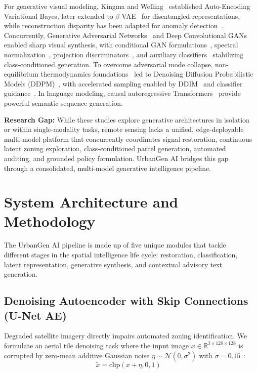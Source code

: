 \documentclass[conference]{IEEEtran}
\begin{document}
For generative visual modeling, Kingma and Welling~\cite{kingma2013auto} established Auto-Encoding Variational Bayes, later extended to $\beta$-VAE~\cite{higgins2017beta} for disentangled representations, while reconstruction disparity has been adapted for anomaly detection~\cite{an2015variational,akcay2018ganomaly}. Concurrently, Generative Adversarial Networks~\cite{goodfellow2014generative} and Deep Convolutional GANs~\cite{radford2015unsupervised} enabled sharp visual synthesis, with conditional GAN formulations~\cite{mirza2014conditional}, spectral normalization~\cite{miyato2018spectral}, projection discriminators~\cite{miyato2018cgans}, and auxiliary classifiers~\cite{odena2017conditional} stabilizing class-conditioned generation. To overcome adversarial mode collapse, non-equilibrium thermodynamics foundations~\cite{sohl2015deep} led to Denoising Diffusion Probabilistic Models (DDPM)~\cite{ho2020denoising}, with accelerated sampling enabled by DDIM~\cite{song2020denoising} and classifier guidance~\cite{dhariwal2021diffusion}. In language modeling, causal autoregressive Transformers~\cite{vaswani2017attention,radford2019language} provide powerful semantic sequence generation.

\noindent\textbf{Research Gap:} While these studies explore generative architectures in isolation or within single-modality tasks, remote sensing lacks a unified, edge-deployable multi-model platform that concurrently coordinates signal restoration, continuous latent zoning exploration, class-conditioned parcel generation, automated auditing, and grounded policy formulation. UrbanGen AI bridges this gap through a consolidated, multi-model generative intelligence pipeline.

\section{System Architecture and Methodology}
The UrbanGen AI pipeline is made up of five unique modules that tackle different stages in the spatial intelligence life cycle: restoration, classification, latent representation, generative synthesis, and contextual advisory text generation.

\subsection{Denoising Autoencoder with Skip Connections (U-Net AE)}
Degraded satellite imagery directly impairs automated zoning identification. We formulate an aerial tile denoising task where the input image $x \in \mathbb{R}^{3 \times 128 \times 128}$ is corrupted by zero-mean additive Gaussian noise $\eta \sim \mathcal{N}(0, \sigma^2)$ with $\sigma = 0.15$~\cite{vincent2008extracting}:
\begin{equation}
\tilde{x} = \text{clip}(x + \eta, 0, 1)
\end{equation}
\end{document}

